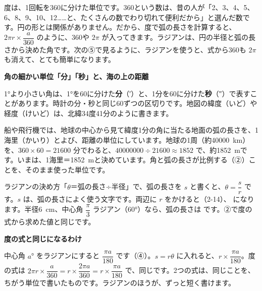 度は、1回転を360に分けた単位です。360という数は、昔の人が「2、3、4、5、6、8、9、10、12……と、たくさんの数でわり切れて便利だから」と選んだ数です。円の形とは関係がありません。だから、度で弧の長さを計算すると、$2\pi r\times\dfrac{a}{360}$ のように、360や $2\pi$ が入ってきます。ラジアンは、円の半径と弧の長さから決めた角です。次の⑤で見るように、ラジアンを使うと、式から360も $2\pi$ も消えて、とても簡単になります。

\begin{motto}[2]
\raggedright
\textbf{角の細かい単位「分」「秒」と、海の上の距離}\par
1°より小さい角は、1°を60に分けた\textbf{分}（′）と、1分を60に分けた\textbf{秒}（″）で表すことがあります。時計の分・秒と同じ60ずつの区切りです。地図の緯度（いど）や経度（けいど）は、北緯34度41分のように書きます。

船や飛行機では、地球の中心から見て緯度1分の角に当たる地面の弧の長さを、1海里（かいり）とよび、距離の単位にしています。地球の1周（約\qty{40000}{km}）を、$360\times60=\num{21600}$ 分でわると、$\num{40000000}\div\num{21600}\approx1852$ で、約\qty{1852}{m}です。いまは、1海里＝\qty{1852}{m}と決めています。角と弧の長さが比例する（②）ことを、そのまま使った単位です。
\end{motto}


\leavevmode\label{bk:4-2:srt}ラジアンの決め方「$\theta$＝弧の長さ÷半径」で、弧の長さを $s$ と書くと、$\theta=\dfrac{s}{r}$ です。$s$ は、弧の長さによく使う文字です。両辺に $r$ をかけると（2-14）、
になります。半径\qty{6}{cm}、中心角 $\dfrac{\pi}{3}$ ラジアン（60°）なら、弧の長さは
です。②で度の式から求めた値と同じです。

\noindent\textbf{度の式と同じになるわけ}\par
中心角 $a$° をラジアンにすると $\dfrac{\pi a}{180}$ です（④）。$s=r\theta$ に入れると、$r\times\dfrac{\pi a}{180}$。度の式は $2\pi r\times\dfrac{a}{360}=r\times\dfrac{2\pi a}{360}=r\times\dfrac{\pi a}{180}$ で、同じです。2つの式は、同じことを、ちがう単位で書いたものです。ラジアンのほうが、ずっと短く書けます。

